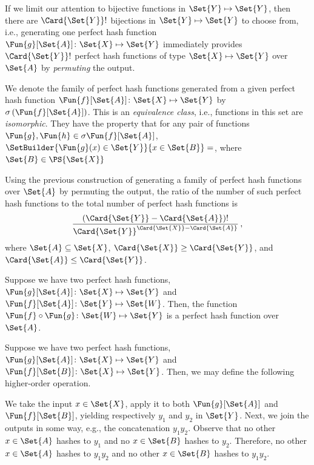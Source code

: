 \documentclass[ ../main.tex]{subfiles}
\begin{document}
If we limit our attention to bijective functions in $\Set{Y} \mapsto \Set{Y}$, then there are $\Card{\Set{Y}}!$ bijections in $\Set{Y} \mapsto \Set{Y}$ to choose from, i.e., generating one perfect hash function $\Fun{g}[\Set{A}] \colon \Set{X} \mapsto \Set{Y}$ immediately provides $\Card{\Set{Y}}!$ perfect hash functions of type $\Set{X} \mapsto \Set{Y}$ over $\Set{A}$ by \emph{permuting} the output.

We denote the family of perfect hash functions generated from a given perfect hash function $\Fun{f}[\Set{A}] \colon \Set{X} \mapsto \Set{Y}$ by $\sigma\left(\Fun{f}[\Set{A}]\right)$.
This is an \emph{equivalence class}, i.e., functions in this set are \emph{isomorphic}.
They have the property that for any pair of functions $\Fun{g},\Fun{h} \in \sigma \Fun{f}[\Set{A}]$, $\SetBuilder{ \Fun{g}(x) \in \Set{Y} }{ x \in \Set{B}} = $, where $\Set{B} \in \PS{\Set{X}}$



Using the previous construction of generating a family of perfect hash functions over $\Set{A}$ by permuting the output, the ratio of the number of such perfect hash functions to the total number of perfect hash functions is
\begin{equation}
	\frac
	{
		\left(\Card{\Set{Y}} - \Card{\Set{A}}\right)!
	}
	{
		\Card{\Set{Y}}^{\Card{\Set{X}} - \Card{\Set{A}}}
	}\,,
\end{equation}
where $\Set{A} \subseteq \Set{X}$, $\Card{\Set{X}} \geq \Card{\Set{Y}}$, and $\Card{\Set{A}} \leq \Card{\Set{Y}}$.



Suppose we have two perfect hash functions, $\Fun{g}[\Set{A}] \colon \Set{X} \mapsto \Set{Y}$ and $\Fun{f}[\Set{A}] \colon \Set{Y} \mapsto \Set{W}$.
Then, the function $\Fun{f} \circ \Fun{g} \colon \Set{W} \mapsto \Set{Y}$ is a perfect hash function over $\Set{A}$.








Suppose we have two perfect hash functions, $\Fun{g}[\Set{A}] \colon \Set{X} \mapsto \Set{Y}$ and $\Fun{f}[\Set{B}] \colon \Set{X} \mapsto \Set{Y}$.
Then, we may define the following higher-order operation.

We take the input $x \in \Set{X}$, apply it to both $\Fun{g}[\Set{A}]$ and $\Fun{f}[\Set{B}]$, yielding respectively $y_1$ and $y_2$ in $\Set{Y}$.
Next, we join the outputs in some way, e.g., the concatenation $y_1 y_2$.
Observe that no other $x \in \Set{A}$ hashes to $y_1$ and no $x \in \Set{B}$ hashes to $y_2$.
Therefore, no other $x \in \Set{A}$ hashes to $y_1 y_2$ and no other $x \in \Set{B}$ hashes to $y_1 y_2$.
\end{document}
